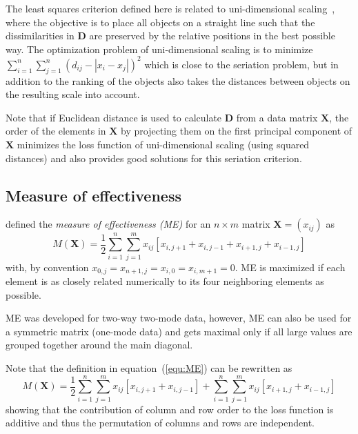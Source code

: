 \documentclass[fleqn, a4paper]{article}
\begin{document}
The least squares criterion defined here is related to uni-dimensional
scaling~\citep{seriation:Leeuw:2005}, where the objective is to place all
objects on a straight line such that the dissimilarities in $\mathbf{D}$ are
preserved by the relative positions in the best possible way.  The optimization
problem of uni-dimensional scaling is to minimize $\sum_{i=1}^n \sum_{j=1}^n
(d_{ij} - |x_i-x_j|)^2$ which is close to the seriation problem, but in
addition to the ranking of the objects also takes the distances between objects
on the resulting scale into account.

Note that if Euclidean distance is used to calculate $\mathbf{D}$ from a data
matrix $\mathbf{X}$, the order of the elements in $\mathbf{X}$ by projecting
them on the first principal component of $\mathbf{X}$ minimizes 
the loss function of uni-dimensional scaling (using squared distances) and
also provides good solutions for this seriation criterion.

\subsection{Measure of effectiveness}
\label{sec:ME}

\cite{seriation:McCormick:1972} defined the
\emph{measure of effectiveness (ME)} for an $n \times m$ matrix $\mathbf{X} =
(x_{ij})$ as
\begin{equation}
    M(\mathbf{X}) =
    \frac{1}{2}
    \sum_{i=1}^{n} \sum_{j=1}^{m} x_{ij}[x_{i,j+1}+x_{i,j-1}+
        x_{i+1,j}+x_{i-1,j}]
    \label{equ:ME}
\end{equation}
with, by convention $x_{0,j}=x_{n+1,j}=x_{i,0}=x_{i,m+1}=0$.  ME is maximized
if each element is as closely related numerically to its four neighboring
elements as possible.

ME was developed for two-way two-mode data, however, ME can also be used for a
symmetric  matrix (one-mode data) and gets maximal only if all large values are
grouped together around the main diagonal. 

Note that the definition in equation~(\ref{equ:ME}) 
can be rewritten as
\begin{equation}
    M(\mathbf{X}) =
    \frac{1}{2}
    \sum_{i=1}^{n} \sum_{j=1}^{m} x_{ij}[x_{i,j+1}+x_{i,j-1}] +
    \sum_{i=1}^{n} \sum_{j=1}^{m} x_{ij}[x_{i+1,j}+x_{i-1,j}]
\end{equation}
showing that the contribution of column and row order to the loss function is
additive and thus the permutation of columns and rows are independent. 
\end{document}
